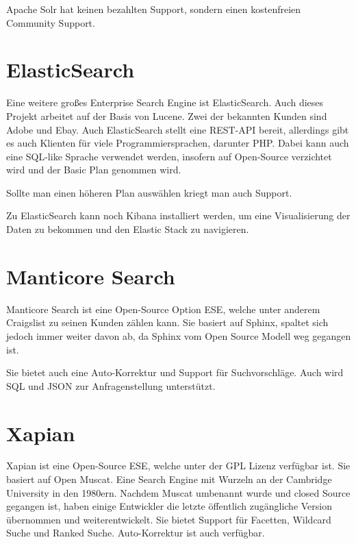 Apache Solr hat keinen bezahlten Support, sondern einen kostenfreien Community Support.

\cite{TheApacheSoftwareFoundation.2019}

\section{ElasticSearch}

Eine weitere großes Enterprise Search Engine ist ElasticSearch. Auch dieses Projekt arbeitet auf der Basis von Lucene. Zwei der bekannten Kunden sind Adobe und Ebay. Auch ElasticSearch stellt eine REST-API bereit, allerdings gibt es auch Klienten für viele Programmiersprachen, darunter PHP. Dabei kann auch eine SQL-like Sprache verwendet werden, insofern auf Open-Source verzichtet wird und der Basic Plan genommen wird. \cite{ElasticSearchSub.2019}

Sollte man einen höheren Plan auswählen kriegt man auch Support.

Zu ElasticSearch kann noch Kibana installiert werden, um eine Visualisierung der Daten zu bekommen und den Elastic Stack zu navigieren.

\cite{Elasticsearch.2019}

\section{Manticore Search}

Manticore Search ist eine Open-Source Option ESE, welche unter anderem Craigslist zu seinen Kunden zählen kann. Sie basiert auf Sphinx, spaltet sich jedoch immer weiter davon ab, da Sphinx vom Open Source Modell weg gegangen ist.

Sie bietet auch eine Auto-Korrektur und Support für Suchvorschläge. Auch wird SQL und JSON zur Anfragenstellung unterstützt.

\cite{ManticoreSoftwareLtd.2019}


\section{Xapian}

Xapian ist eine Open-Source ESE, welche unter der GPL Lizenz verfügbar ist. Sie basiert auf Open Muscat. Eine Search Engine mit Wurzeln an der Cambridge University in den 1980ern. Nachdem Muscat umbenannt wurde und closed Source gegangen ist, haben einige Entwickler die letzte öffentlich zugängliche Version übernommen und weiterentwickelt.
Sie bietet Support für Facetten, Wildcard Suche und Ranked Suche. Auto-Korrektur ist auch verfügbar.

